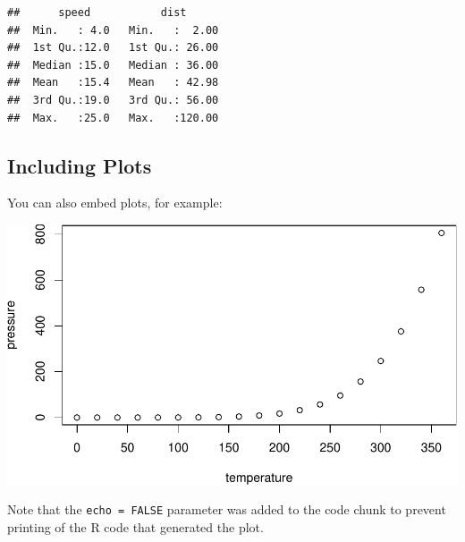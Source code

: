\documentclass[
  landscape]{article}
\begin{document}
\begin{verbatim}
##      speed           dist       
##  Min.   : 4.0   Min.   :  2.00  
##  1st Qu.:12.0   1st Qu.: 26.00  
##  Median :15.0   Median : 36.00  
##  Mean   :15.4   Mean   : 42.98  
##  3rd Qu.:19.0   3rd Qu.: 56.00  
##  Max.   :25.0   Max.   :120.00
\end{verbatim}

\hypertarget{including-plots}{%
\subsection{Including Plots}\label{including-plots}}

You can also embed plots, for example:

\includegraphics{test_files/figure-latex/pressure-1.pdf}

Note that the \texttt{echo\ =\ FALSE} parameter was added to the code
chunk to prevent printing of the R code that generated the plot.
\end{document}
